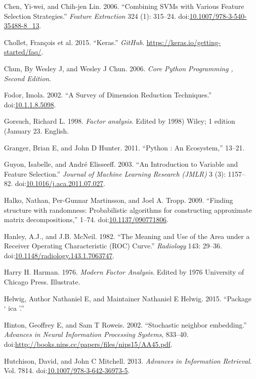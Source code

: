 \documentclass[]{article}
\begin{document}
Chen, Yi-wei, and Chih-jen Lin. 2006. ``Combining SVMs with Various
Feature Selection Strategies.'' \emph{Feature Extraction} 324 (1):
315--24.
doi:\href{http://dx.doi.org/10.1007/978-3-540-35488-8_13}{10.1007/978-3-540-35488-8\_13}.

Chollet, Fran{ç}ois et al. 2015. ``Keras.'' \emph{GitHub}.
\url{https://keras.io/getting-started/faq/}.

Chun, By Wesley J, and Wesley J Chun. 2006. \emph{Core Python
Programming , Second Edition}.

Fodor, Imola. 2002. ``A Survey of Dimension Reduction Techniques.''
doi:\href{http://dx.doi.org/10.1.1.8.5098}{10.1.1.8.5098}.

Gorsuch, Richard L. 1998. \emph{Factor analysis}. Edited by 1998)
{Wiley; 1 edition (January 23}. English.

Granger, Brian E, and John D Hunter. 2011. ``Python : An Ecosystem,''
13--21.

Guyon, Isabelle, and Andr{é} Elisseeff. 2003. ``An Introduction to
Variable and Feature Selection.'' \emph{Journal of Machine Learning
Research (JMLR)} 3 (3): 1157--82.
doi:\href{http://dx.doi.org/10.1016/j.aca.2011.07.027}{10.1016/j.aca.2011.07.027}.

Halko, Nathan, Per-Gunnar Martinsson, and Joel A. Tropp. 2009. ``Finding
structure with randomness: Probabilistic algorithms for constructing
approximate matrix decompositions,'' 1--74.
doi:\href{http://dx.doi.org/10.1137/090771806}{10.1137/090771806}.

Hanley, A.J., and J.B. McNeil. 1982. ``The Meaning and Use of the Area
under a Receiver Operating Characteristic (ROC) Curve.''
\emph{Radiology} 143: 29--36.
doi:\href{http://dx.doi.org/10.1148/radiology.143.1.7063747}{10.1148/radiology.143.1.7063747}.

Harry H. Harman. 1976. \emph{Modern Factor Analysis}. Edited by 1976
{University of Chicago Press}. Illustrate.

Helwig, Author Nathaniel E, and Maintainer Nathaniel E Helwig. 2015.
``Package ` ica '.''

Hinton, Geoffrey E, and Sam T Roweis. 2002. ``Stochastic neighbor
embedding.'' \emph{Advances in Neural Information Processing Systems},
833--40.
doi:\href{http://dx.doi.org/http://books.nips.cc/papers/files/nips15/AA45.pdf}{http://books.nips.cc/papers/files/nips15/AA45.pdf}.

Hutchison, David, and John C Mitchell. 2013. \emph{Advances in
Information Retrieval}. Vol. 7814.
doi:\href{http://dx.doi.org/10.1007/978-3-642-36973-5}{10.1007/978-3-642-36973-5}.
\end{document}
